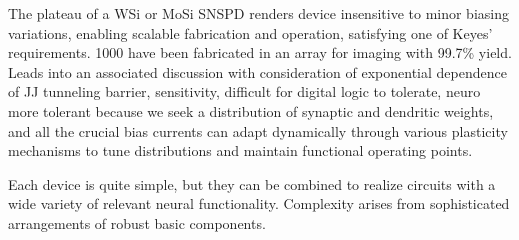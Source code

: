 \vspace{3em}
The plateau of a WSi or MoSi SNSPD renders device insensitive to minor biasing variations, enabling scalable fabrication and operation, satisfying one of Keyes' requirements. 1000 have been fabricated in an array for imaging with 99.7\% yield. Leads into an associated discussion with consideration of exponential dependence of JJ tunneling barrier, sensitivity, difficult for digital logic to tolerate, neuro more tolerant because we seek a distribution of synaptic and dendritic weights, and all the crucial bias currents can adapt dynamically through various plasticity mechanisms to tune distributions and maintain functional operating points.

\vspace{3em}
Each device is quite simple, but they can be combined to realize circuits with a wide variety of relevant neural functionality. Complexity arises from sophisticated arrangements of robust basic components.